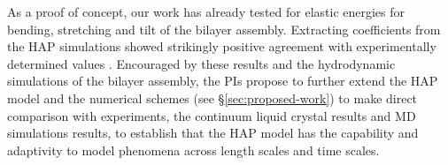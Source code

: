 As a proof of concept, our work has already tested for elastic energies for bending, stretching and tilt of the bilayer assembly.
Extracting coefficients from the HAP simulations showed strikingly
positive agreement with experimentally determined values
\cite{Fu2018_SIAM}.
Encouraged by these results and the hydrodynamic simulations of the bilayer assembly, the PIs propose to
further extend the HAP model and the numerical schemes (see \S\ref{sec:proposed-work})
to make direct comparison with experiments, the continuum liquid crystal results and MD simulations results, to establish that
the HAP model has the capability and adaptivity to model phenomena across length scales and time scales.
%
%
%
%
%
%


%


